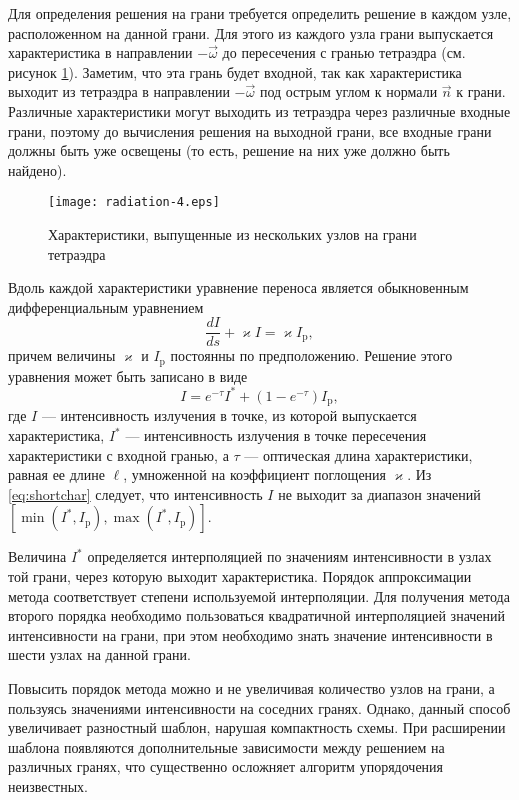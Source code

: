 Для определения решения на грани требуется определить решение в каждом узле, расположенном на данной грани. Для этого из каждого узла грани выпускается характеристика в направлении $-\vec\omega$ до пересечения с гранью тетраэдра (см. рисунок \ref{fig:manychar}). Заметим, что эта грань будет входной, так как характеристика выходит из тетраэдра в направлении $-\vec\omega$ под острым углом к нормали $\vec n$ к грани. Различные характеристики могут выходить из тетраэдра через различные входные грани, поэтому до вычисления решения на выходной грани, все входные грани должны быть уже освещены (то есть, решение на них уже должно быть найдено).
\begin{figure}[ht!]
\centering
\texttt{[image: radiation-4.eps]}
\caption{Характеристики, выпущенные из нескольких узлов на грани тетраэдра}
\label{fig:manychar}
\end{figure}

Вдоль каждой характеристики уравнение переноса является обыкновенным дифференциальным уравнением
\[
\frac{dI}{ds} + \varkappa I = \varkappa I_\text{p},
\]
причем величины $\varkappa$ и $I_\text{p}$ постоянны по предположению. Решение этого уравнения может быть записано в виде
\begin{equation}
I = e^{-\tau} I^*  + \left(1 - e^{-\tau}\right) I_\text{p},
\label{eq:shortchar}
\end{equation}
где $I$ --- интенсивность излучения в точке, из которой выпускается характеристика, $I^*$ --- интенсивность излучения в точке пересечения характеристики с входной гранью, а $\tau$ --- оптическая длина характеристики, равная ее длине $\ell$, умноженной на коэффициент поглощения $\varkappa$. Из \eqref{eq:shortchar} следует, что интенсивность $I$ не выходит за диапазон значений $[\min(I^*, I_\text{p}), \max(I^*, I_\text{p})]$.

Величина $I^*$ определяется интерполяцией по значениям интенсивности в узлах той грани, через которую выходит характеристика. Порядок аппроксимации метода соответствует степени используемой интерполяции. Для получения метода второго порядка необходимо пользоваться квадратичной интерполяцией значений интенсивности на грани, при этом необходимо знать значение интенсивности в шести узлах на данной грани.

Повысить порядок метода можно и не увеличивая количество узлов на грани, а пользуясь значениями интенсивности на соседних гранях. Однако, данный способ увеличивает разностный шаблон, нарушая компактность схемы. При расширении шаблона появляются дополнительные зависимости между решением на различных гранях, что существенно осложняет алгоритм упорядочения неизвестных.

